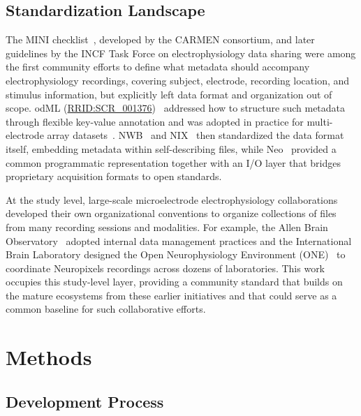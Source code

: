 \documentclass[fleqn,10pt]{article}
\newcommand{\rrid}[1]{\href{https://scicrunch.org/resolver/#1}{#1}}
\begin{document}
\subsection*{Standardization Landscape}\label{sec:standardization-landscape}

The MINI checklist~\citep{gibson_minimum_2009}, developed by the CARMEN consortium, and later guidelines by the INCF Task Force on electrophysiology data sharing \citep{teeters_requirements_2016} were among the first community efforts to define what metadata should accompany electrophysiology recordings, covering subject, electrode, recording location, and stimulus information, but explicitly left data format and organization out of scope.
odML (\rrid{RRID:SCR\_001376})~\citep{grewe_bottom-up_2011} addressed how to structure such metadata through flexible key-value annotation and was adopted in practice for multi-electrode array datasets~\citep{zehl_handling_2016}.
NWB~\citep{teeters_neurodata_2015} and NIX~\citep{adrian_file_2014} then standardized the data format itself, embedding metadata within self-describing files, while Neo~\citep{garcia_neo_2014} provided a common programmatic representation together with an I/O layer that bridges proprietary acquisition formats to open standards.

At the study level, large-scale microelectrode electrophysiology collaborations developed their own organizational conventions to organize collections of files from many recording sessions and modalities. For example, the Allen Brain Observatory~\citep{de_vries_sharing_2023} adopted internal data management practices and the International Brain Laboratory designed the Open Neurophysiology Environment (ONE)~\citep{one2024, international_brain_laboratory_modular_2023} to coordinate Neuropixels recordings across dozens of laboratories.
This work occupies this study-level layer, providing a community standard that builds on the mature ecosystems from these earlier initiatives and that could serve as a common baseline for such collaborative efforts.

\section*{Methods}\label{sec:methods}

\subsection*{Development Process}\label{sec:development-process}
\end{document}
